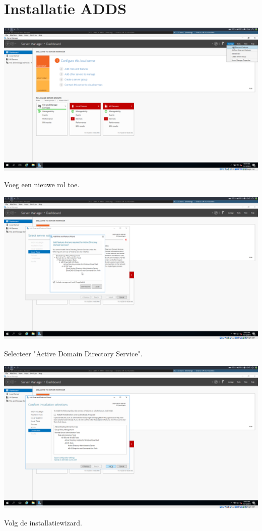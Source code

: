 \documentclass[a4paper]{article}
\begin{document}
\section{Installatie ADDS}
\begin{center}
	\includegraphics[width=15cm]{Pictures/DC2/ADDS/1542307480.png}
	
	Voeg een nieuwe rol toe.
\end{center}
\begin{center}
	\includegraphics[width=15cm]{Pictures/DC2/ADDS/1542307514.png}
	
	Selecteer "Active Domain Directory Service".
\end{center}
\begin{center}
	\includegraphics[width=15cm]{Pictures/DC2/ADDS/1542307525.png}
	
	Volg de installatiewizard.
\end{center}
\end{document}
